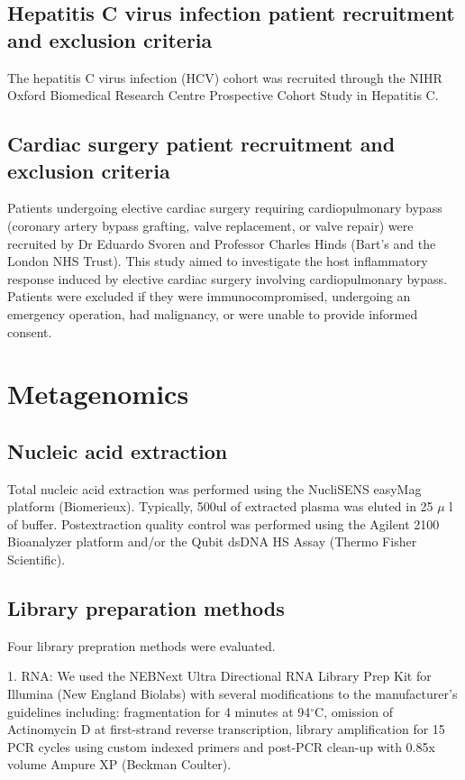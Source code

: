 \subsection{Hepatitis C virus infection patient recruitment and exclusion criteria}
The hepatitis C virus infection (HCV) cohort was recruited through the NIHR Oxford Biomedical Research Centre Prospective Cohort Study in Hepatitis C. 

\subsection{Cardiac surgery patient recruitment and exclusion criteria}
Patients undergoing elective cardiac surgery requiring cardiopulmonary bypass (coronary artery bypass grafting, valve replacement, or valve repair) were recruited by Dr Eduardo Svoren and Professor Charles Hinds (Bart's and the London NHS Trust). This study aimed to investigate the host inflammatory response induced by elective cardiac surgery involving cardiopulmonary bypass. Patients were excluded if they were immunocompromised, undergoing an emergency operation, had malignancy, or were unable to provide informed consent. 


\section{Metagenomics}
\subsection{Nucleic acid extraction}

Total nucleic acid extraction was performed using the NucliSENS easyMag platform (Biomerieux). Typically, 500ul of extracted plasma was eluted in 25 $\mu$ l of buffer. Postextraction quality control was performed using the Agilent 2100 Bioanalyzer platform and/or the Qubit dsDNA HS Assay (Thermo Fisher Scientific).

\subsection{Library preparation methods}
Four library prepration methods were evaluated.

1. RNA: We used the NEBNext Ultra Directional RNA Library Prep Kit for Illumina (New England Biolabs) with several modifications to the manufacturer’s guidelines including: fragmentation for 4 minutes at 94$^{\circ}$C, omission of Actinomycin D at first-strand reverse transcription, library amplification for 15 PCR cycles using custom indexed primers and post-PCR clean-up with 0.85x volume Ampure XP (Beckman Coulter).

